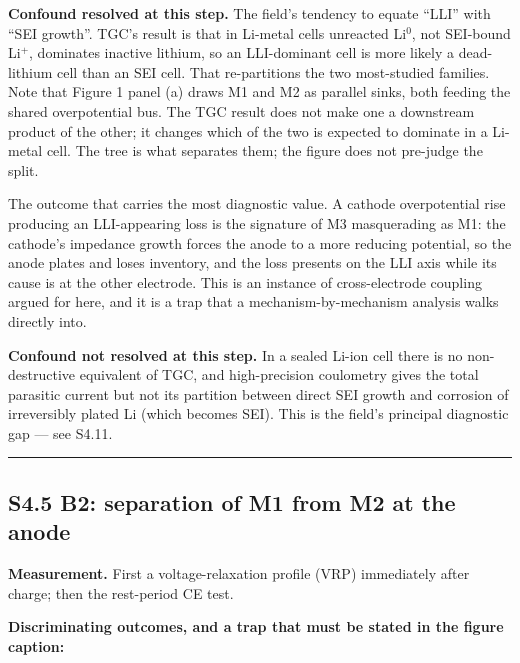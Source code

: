\documentclass[11pt,a4paper]{article}
\begin{document}
\textbf{Confound resolved at this step.} The field's tendency to equate \textquotedblleft{}LLI\textquotedblright{} with \textquotedblleft{}SEI growth\textquotedblright{}. TGC's result is that in Li-metal cells unreacted Li\ensuremath{^{0}}, not SEI-bound Li\ensuremath{^{+}}, dominates inactive lithium, so an LLI-dominant cell is more likely a dead-lithium cell than an SEI cell. That re-partitions the two most-studied families. Note that Figure 1 panel (a) draws M1 and M2 as parallel sinks, both feeding the shared overpotential bus. The TGC result does not make one a downstream product of the other; it changes which of the two is expected to dominate in a Li-metal cell. The tree is what separates them; the figure does not pre-judge the split.


The outcome that carries the most diagnostic value. A cathode overpotential rise producing an LLI-appearing loss is the signature of M3 masquerading as M1: the cathode's impedance growth forces the anode to a more reducing potential, so the anode plates and loses inventory, and the loss presents on the LLI axis while its cause is at the other electrode. This is an instance of cross-electrode coupling argued for here, and it is a trap that a mechanism-by-mechanism analysis walks directly into.


\textbf{Confound not resolved at this step.} In a sealed Li-ion cell there is no non-destructive equivalent of TGC, and high-precision coulometry gives the total parasitic current but not its partition between direct SEI growth and corrosion of irreversibly plated Li (which becomes SEI). This is the field's principal diagnostic gap --- see S4.11.


\par\noindent\rule{\linewidth}{0.4pt}\par


\subsection*{S4.5 B2: separation of M1 from M2 at the anode}


\textbf{Measurement.} First a voltage-relaxation profile (VRP) immediately after charge; then the rest-period CE test.


\textbf{Discriminating outcomes, and a trap that must be stated in the figure caption:}
\end{document}

